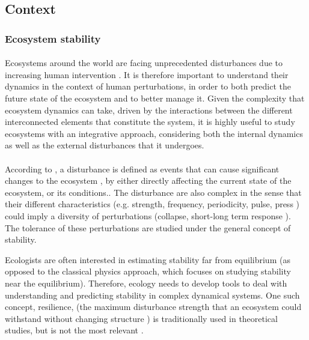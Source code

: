 \documentclass{article}
\begin{document}
\newpage


\subsection*{Context}

\subsubsection*{Ecosystem stability} %

\paragraph{}
Ecosystems around the world are facing unprecedented disturbances due to increasing human intervention \citep{oosthoek_humanity_2005}. It is therefore important to understand their dynamics in the context of human perturbations, in order to both predict the future state of the ecosystem and to better manage it.
Given the complexity that ecosystem dynamics can take, driven by the interactions between the different interconnected elements that constitute the system, it is highly useful to study ecosystems with an integrative approach, considering both the internal dynamics as well as the external disturbances that it undergoes.

\paragraph{} %
According to \cite{rykiel_towards_1985}, a disturbance is defined  as events that can cause significant changes to the ecosystem \citep{white1985natural, rykiel_towards_1985}, by either directly affecting the current state of the ecosystem, or its conditions.. The disturbance are also complex in the sense that their different characteristics (e.g. strength, frequency, periodicity, pulse, press \citep{bender1984perturbation}) could imply a diversity of perturbations (collapse, short-long term response \citep{arnoldi2018ecosystems}). The tolerance of these perturbations are studied under the general concept of stability.

\label{stability_litterature}
Ecologists are often interested in estimating stability far from equilibrium (as opposed to the classical physics approach, which focuses on studying stability near the equilibrium). Therefore, ecology needs to develop tools to deal with understanding and predicting stability in complex dynamical systems. 
One such concept, resilience, (the maximum disturbance strength that an ecosystem could withstand without changing structure \citep{holling_resilience_1973}) is traditionally used in theoretical studies, but is not the most relevant %
\citep{gunderson_ecological_2000, neubert_alternatives_1997}.
\end{document}
